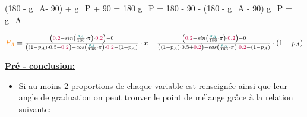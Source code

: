 \documentclass[10pt]{article}
\begin{document}
\begin{center}

        \left(180 - \color{orange}g_{A}\color{black}\right - 90) + \color{teal}g_{P}\color{black} + 90 = 180 \Leftrightarrow \color{teal}g_{P}\color{black} = 180 - 90 - \left(180 - \color{orange}g_{A}\color{black} - 90\right) \Leftrightarrow \color{teal}g_{P}\color{black} = \color{orange}g_{A}\color{black} 

\vspace{.5cm}

$\color{orange}F_{A}\color{black} = \frac{\left(\color{purple}0.2\color{black} - sin\left(\frac{\color{teal}g_{A}\color{black}}{180}\cdot \pi\right)\cdot \color{purple}0.2\color{black}\right) - 0}{\left(\left(1 - p_{A}\right)\cdot 0.5 + \color{purple}0.2\color{black}\right) - cos\left(\frac{\color{teal}g_{A}\color{black}}{180}\cdot \pi\right)\cdot \color{purple}0.2\color{black} - \left(1 - p_{A}\right)}\cdot x - \frac{\left(\color{purple}0.2\color{black} - sin\left(\frac{\color{teal}g_{A}\color{black}}{180}\cdot \pi\right)\cdot \color{purple}0.2\color{black}\right) - 0}{\left(\left(1 - p_{A}\right)\cdot 0.5 + \color{purple}0.2\color{black}\right) - cos\left(\frac{\color{teal}g_{A}\color{black}}{180}\cdot \pi\right)\cdot \color{purple}0.2\color{black} - \left(1 - p_{A}\right)}\cdot \left(1 - p_{A}\right)$

\end{center}

\vspace{.5cm}

\uline{\textbf{Pré - conclusion:}}

\vspace{.5cm}

\begin{itemize}

        \item Si au moins 2 proportions de chaque variable est renseignée ainsi que leur angle de graduation on peut trouver le point de mélange grâce à la relation suivante: \\[.5cm]


\end{itemize}
\end{document}
